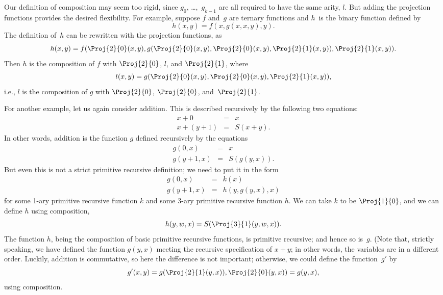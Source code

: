 \documentclass[../../../include/open-logic-section]{subfiles}
\begin{document}
Our definition of composition may seem too rigid, since
$g_0$, \dots,~$g_{k-1}$ are all required to have the same arity, $l$. But
adding the projection functions provides the desired flexibility. For
example, suppose $f$ and~$g$ are ternary functions and $h$~is the
binary function defined by
\[
h(x,y) = f(x,g(x,x,y),y).
\]
The definition of~$h$ can be rewritten with the projection
functions, as
\[
h(x,y) = f(\Proj{2}{0}(x,y), g(\Proj{2}{0}(x,y), \Proj{2}{0}(x,y),
\Proj{2}{1}(x,y)), \Proj{2}{1}(x,y)).
\]
Then $h$ is the composition of $f$ with $\Proj{2}{0}$, $l$, and
$\Proj{2}{1}$, where
\[
l(x,y) = g(\Proj{2}{0}(x,y),\Proj{2}{0}(x,y),\Proj{2}{1}(x,y)),
\]
i.e., $l$ is the composition of $g$ with $\Proj{2}{0}$, $\Proj{2}{0}$,
and~$\Proj{2}{1}$.

For another example, let us again consider addition. This is
described recursively by the following two equations:
\begin{eqnarray*}
x + 0 & = & x \\
x + (y+1) & = & S(x+y).
\end{eqnarray*}
In other words, addition is the function $g$ defined recursively by
the equations
\begin{eqnarray*}
g(0,x) & = & x \\
g(y+1,x) & = & S(g(y,x)).
\end{eqnarray*}
But even this is not a strict primitive recursive definition; we need
to put it in the form
\begin{eqnarray*}
g(0,x) & = & k(x) \\
g(y+1,x) & = & h(y,g(y,x),x)
\end{eqnarray*}
for some 1-ary primitive recursive function $k$ and some 3-ary
primitive recursive function $h$. We can take $k$ to be $\Proj{1}{0}$, and
we can define $h$ using composition,
\[
h(y,w,x) = S(\Proj{3}{1}(y,w,x)).
\]
The function $h$, being the composition of basic primitive recursive
functions, is primitive recursive; and hence so is~$g$. (Note that,
strictly speaking, we have defined the function $g(y, x)$ meeting the
recursive specification of $x + y$; in other words, the variables are
in a different order. Luckily, addition is commutative, so here the
difference is not important; otherwise, we could define the
function~$g'$ by
\[
g'(x,y) = g(\Proj{2}{1}(y,x)),\Proj{2}{0}(y,x)) = g(y,x),
\]
using composition.
\end{document}
